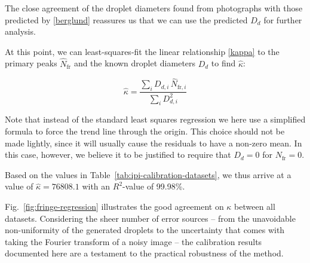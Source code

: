 \documentclass[11.5pt,oneside]{book}
\newcommand*{\figref}[1]{Fig.~\ref{#1}}
\newcommand*{\tableref}[1]{Table~\ref{#1}}
\begin{document}
The close agreement of the droplet diameters found from photographs with those
predicted by \eqref{berglund} reassures us that we can use the predicted $D_d$
for further analysis.

At this point, we can least-squares-fit the linear relationship \eqref{kappa} to the primary
peaks $\hat{N}_\text{fr}$ and the known droplet diameters $D_d$ to find
$\hat{\kappa}$:

\begin{equation}
    \hat{\kappa} = \frac{\sum_i D_{d,i} \, \hat{N}_{\text{fr}, i}}{\sum_i
    D_{d,i}^2}
\end{equation}

Note that instead of the standard least squares regression we here use a
simplified formula to force the trend line through the origin. This choice
should not be made lightly, since it will usually cause the residuals to have a
non-zero mean. In this case, however, we believe it to be justified to require
that $D_d = 0$ for $N_\text{fr} = 0$.

Based on the values in \tableref{tab:ipi-calibration-datasets}, we thus arrive
at a value of $\hat{\kappa} = 76808.1$ with an $R^2$-value of 99.98\%. 

\figref{fig:fringe-regression} illustrates the good agreement on $\kappa$ between
all datasets. Considering the sheer number of error sources -- from the
unavoidable non-uniformity of the generated droplets to the uncertainty that
comes with taking the Fourier transform of a noisy image -- the calibration
results documented here are a testament to the practical robustness of the
method.
\end{document}
